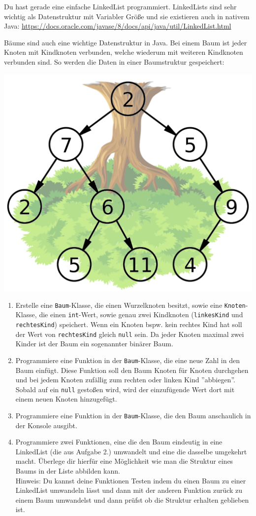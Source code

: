 \documentclass{../../sheet}
\begin{document}
Du hast gerade eine einfache LinkedList programmiert. LinkedLists sind sehr wichtig als Datenstruktur mit Variabler Größe und sie existieren auch in nativem Java: \url{https://docs.oracle.com/javase/8/docs/api/java/util/LinkedList.html}

\newpage
{}
Bäume sind auch eine wichtige Datenstruktur in Java. Bei einem Baum ist jeder Knoten mit Kindknoten verbunden, welche wiederum mit weiteren Kindknoten verbunden sind. So werden die Daten in einer Baumstruktur gespeichert:
\\
\begin{center}
    \includegraphics[width=0.5\linewidth]{img/baum.png}
\end{center}

\begin{enumerate}
    \item Erstelle eine \texttt{Baum}-Klasse, die einen Wurzelknoten besitzt, sowie eine \texttt{Knoten}-Klasse, die einen \texttt{int}-Wert, sowie genau zwei Kindknoten (\texttt{linkesKind} und \texttt{rechtesKind}) speichert. Wenn ein Knoten bspw. kein rechtes Kind hat soll der Wert von \texttt{rechtesKind} gleich \texttt{null} sein. Da jeder Knoten maximal zwei Kinder ist der Baum ein sogenannter binärer Baum.
    \item Programmiere eine Funktion in der \texttt{Baum}-Klasse, die eine neue Zahl in den Baum einfügt. Diese Funktion soll den Baum Knoten für Knoten durchgehen und bei jedem Knoten zufällig zum rechten oder linken Kind ''abbiegen''. Sobald auf ein \texttt{null} gestoßen wird, wird der einzufügende Wert dort mit einem neuen Knoten hinzugefügt.
    \item Programmiere eine Funktion in der \texttt{Baum}-Klasse, die den Baum anschaulich in der Konsole ausgibt.
    \item Programmiere zwei Funktionen, eine die den Baum eindeutig in eine LinkedList (die aus Aufgabe 2.) umwandelt und eine die dasselbe umgekehrt macht. Überlege dir hierfür eine Möglichkeit wie man die Struktur eines Baums in der Liste abbilden kann.\\
    Hinweis: Du kannst deine Funktionen Testen indem du einen Baum zu einer LinkedList umwandeln lässt und dann mit der anderen Funktion zurück zu einem Baum umwandelst und dann prüfst ob die Struktur erhalten geblieben ist.
\end{enumerate}
\end{document}
